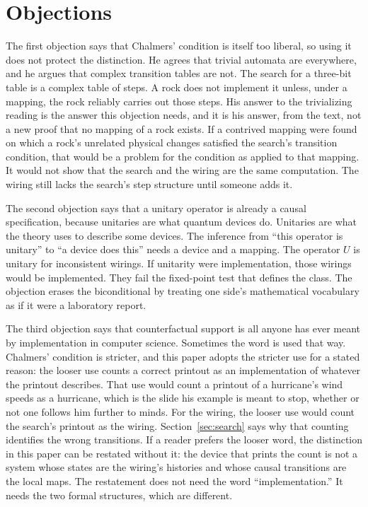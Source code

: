 \documentclass[11pt]{article}
\begin{document}
\section{Objections}
\label{sec:obj}

The first objection says that Chalmers' condition is itself too liberal, so using it does not protect the distinction. He agrees that trivial automata are everywhere, and he argues that complex transition tables are not. The search for a three-bit table is a complex table of steps. A rock does not implement it unless, under a mapping, the rock reliably carries out those steps. His answer to the trivializing reading is the answer this objection needs, and it is his answer, from the text, not a new proof that no mapping of a rock exists. If a contrived mapping were found on which a rock's unrelated physical changes satisfied the search's transition condition, that would be a problem for the condition as applied to that mapping. It would not show that the search and the wiring are the same computation. The wiring still lacks the search's step structure until someone adds it.

The second objection says that a unitary operator is already a causal specification, because unitaries are what quantum devices do. Unitaries are what the theory uses to describe some devices. The inference from ``this operator is unitary'' to ``a device does this'' needs a device and a mapping. The operator \(U\) is unitary for inconsistent wirings. If unitarity were implementation, those wirings would be implemented. They fail the fixed-point test that defines the class. The objection erases the biconditional by treating one side's mathematical vocabulary as if it were a laboratory report.

The third objection says that counterfactual support is all anyone has ever meant by implementation in computer science. Sometimes the word is used that way. Chalmers' condition is stricter, and this paper adopts the stricter use for a stated reason: the looser use counts a correct printout as an implementation of whatever the printout describes. That use would count a printout of a hurricane's wind speeds as a hurricane, which is the slide his example is meant to stop, whether or not one follows him further to minds. For the wiring, the looser use would count the search's printout as the wiring. Section~\ref{sec:search} says why that counting identifies the wrong transitions. If a reader prefers the looser word, the distinction in this paper can be restated without it: the device that prints the count is not a system whose states are the wiring's histories and whose causal transitions are the local maps. The restatement does not need the word ``implementation.'' It needs the two formal structures, which are different.
\end{document}
